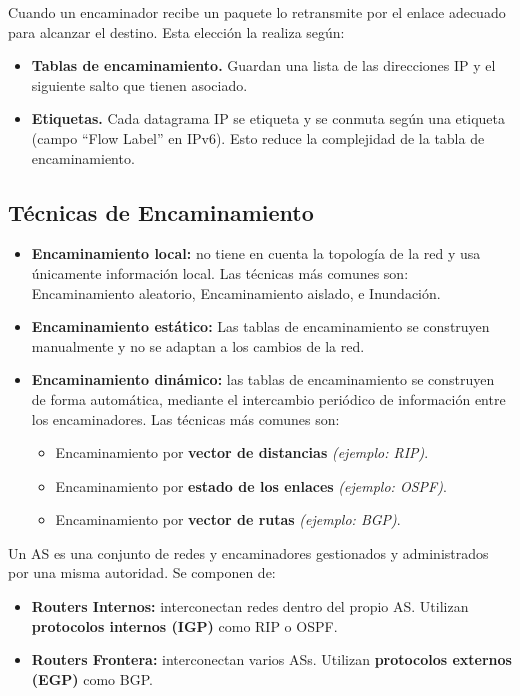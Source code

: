 Cuando un encaminador recibe un paquete lo retransmite por el enlace
adecuado para alcanzar el destino. Esta elección la realiza según:

\begin{itemize}
    \item \textbf{Tablas de encaminamiento.} Guardan una lista de las direcciones IP y el siguiente salto que tienen asociado.
    \item \textbf{Etiquetas.} Cada datagrama IP se etiqueta y se conmuta según una etiqueta (campo \enquote{Flow Label} en IPv6). Esto reduce la complejidad de la tabla de encaminamiento.
\end{itemize}
\subsection{Técnicas de Encaminamiento}
\begin{itemize}
    \item \textbf{Encaminamiento local: } no tiene en cuenta la topología de la red y usa únicamente información local. Las técnicas más comunes son: Encaminamiento aleatorio, Encaminamiento aislado, e Inundación.
    \item \textbf{Encaminamiento estático: }Las tablas de encaminamiento se construyen manualmente y no se adaptan a los cambios de la red.
    \item \textbf{Encaminamiento dinámico: }las tablas de encaminamiento se construyen de forma automática, mediante el intercambio periódico de información entre los encaminadores. Las técnicas más comunes son:
    \begin{itemize}
        \item Encaminamiento por \textbf{vector de distancias} \textit{(ejemplo: RIP)}.
        \item Encaminamiento por \textbf{estado de los enlaces} \textit{(ejemplo: OSPF)}.
        \item Encaminamiento por \textbf{vector de rutas} \textit{(ejemplo: BGP)}.
    \end{itemize}
    \end{itemize}
    \begin{tcolorbox}[
    title=Sistemas Autónomos (AS),
    colback=blue!5!white,
    colframe=blue!75!black,
    fonttitle=\bfseries]
    Un AS es una conjunto de redes y encaminadores gestionados y administrados por una misma autoridad. Se componen de:
    \begin{itemize}
        \item \textbf{Routers Internos: }interconectan redes dentro del propio AS. Utilizan \textbf{protocolos internos (IGP)} como RIP o OSPF.
        \item \textbf{Routers Frontera: }interconectan varios ASs. Utilizan \textbf{protocolos externos (EGP)} como BGP.
    \end{itemize}
    \end{tcolorbox}
